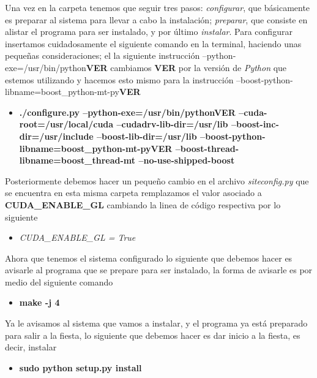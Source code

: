 \documentclass{article}
\begin{document}
Una vez en la carpeta tenemos que seguir tres pasos: \emph{configurar},
que básicamente es preparar al sistema para llevar a cabo la
instalación; \emph{preparar}, que consiste en alistar el programa para
ser instalado, y por último \emph{instalar}. Para configurar insertamos
cuidadosamente el siguiente comando en la terminal, haciendo unas
pequeñas consideraciones; el la siguiente instrucción
--python-exe=/usr/bin/python\textbf{VER} cambiamos \textbf{VER} por la
versión de \emph{Python} que estemos utilizando y hacemos esto mismo
para la instrucción
--boost-python-libname=boost\_python-mt-py\textbf{VER}

\begin{itemize}
\itemsep1pt\parskip0pt
\item
  \textbf{./configure.py --python-exe=/usr/bin/pythonVER
  --cuda-root=/usr/local/cuda --cudadrv-lib-dir=/usr/lib
  --boost-inc-dir=/usr/include --boost-lib-dir=/usr/lib
  --boost-python-libname=boost\_python-mt-pyVER
  --boost-thread-libname=boost\_thread-mt --no-use-shipped-boost}
\end{itemize}

Posteriormente debemos hacer un pequeño cambio en el archivo
\emph{siteconfig.py} que se encuentra en esta misma carpeta remplazamos
el valor asociado a \textbf{CUDA\_ENABLE\_GL} cambiando la linea de
código respectiva por lo siguiente

\begin{itemize}
\itemsep1pt\parskip0pt
\item
  \emph{CUDA\_ENABLE\_GL = True}
\end{itemize}

Ahora que tenemos el sistema configurado lo siguiente que debemos hacer
es avisarle al programa que se prepare para ser instalado, la forma de
avisarle es por medio del siguiente comando

\begin{itemize}
\itemsep1pt\parskip0pt
\item
  \textbf{make -j 4}
\end{itemize}

Ya le avisamos al sistema que vamos a instalar, y el programa ya está
preparado para salir a la fiesta, lo siguiente que debemos hacer es dar
inicio a la fiesta, es decir, instalar

\begin{itemize}
\itemsep1pt\parskip0pt
\item
  \textbf{sudo python setup.py install}
\end{itemize}
\end{document}

